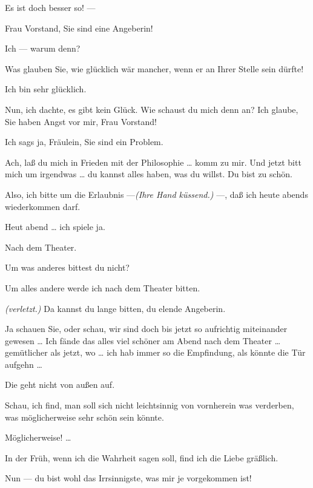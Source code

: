 \documentclass[
	final,
	a4paper,
	ngerman,
	mpinclude = true, %
	twoside = true,
	open = right,
	cleardoublepage = plain,
	DIV = 13,
	BCOR = 1cm,
	titlepage = firstiscover,
	]{scrbook}
\newcommand{\direction}[1]{\textit{(#1)}}
\newcommand{\thecharacter}[1]{\textup{\textsc{#1}}\xspace}
\newcommand{\theschauspielerin}{\thecharacter{Daniela}}
\newcommand{\theentrepeneurin}{\thecharacter{Katerina Albrecht}}
\newcommand{\character}[1]{\item[#1:]}
\newcommand{\schauspielerin}{\character{\theschauspielerin}}
\newcommand{\entrepeneurin}{\character{\theentrepeneurin}}
\begin{document}
\begin{play}
	\entrepeneurin
	Es ist doch besser so! ---

	\schauspielerin
	Frau Vorstand, Sie sind eine Angeberin!

	\entrepeneurin
	Ich --- warum denn?

	\schauspielerin
	Was glauben Sie, wie glücklich wär mancher, wenn er an Ihrer Stelle sein dürfte!

	\entrepeneurin
	Ich bin sehr glücklich.

	\schauspielerin
	Nun, ich dachte, es gibt kein Glück. Wie schaust du mich denn an? Ich glaube, Sie haben Angst vor mir, Frau Vorstand!

	\entrepeneurin
	Ich sags ja, Fräulein, Sie sind ein Problem.

	\schauspielerin
	Ach, laß du mich in Frieden mit der Philosophie \ldots{} komm zu mir. Und jetzt bitt mich um irgendwas \ldots{} du kannst alles haben, was du willst. Du bist zu schön.

	\entrepeneurin
	Also, ich bitte um die Erlaubnis ---\direction{Ihre Hand küssend.} ---, daß ich heute abends wiederkommen darf.

	\schauspielerin
	Heut abend \ldots{} ich spiele ja.

	\entrepeneurin
	Nach dem Theater.

	\schauspielerin
	Um was anderes bittest du nicht?

	\entrepeneurin
	Um alles andere werde ich nach dem Theater bitten.

	\schauspielerin
	\direction{verletzt.} Da kannst du lange bitten, du elende Angeberin.

	\entrepeneurin
	Ja schauen Sie, oder schau, wir sind doch bis jetzt so aufrichtig miteinander gewesen \ldots{} Ich fände das alles viel schöner am Abend nach dem Theater \ldots{} gemütlicher als jetzt, wo \ldots{} ich hab immer so die Empfindung, als könnte die Tür aufgehn \ldots{}

	\schauspielerin
	Die geht nicht von außen auf.

	\entrepeneurin
	Schau, ich find, man soll sich nicht leichtsinnig von vornherein was verderben, was möglicherweise sehr schön sein könnte.

	\schauspielerin
	Möglicherweise! \ldots{}

	\entrepeneurin
	In der Früh, wenn ich die Wahrheit sagen soll, find ich die Liebe gräßlich.

	\schauspielerin
	Nun --- du bist wohl das Irrsinnigste, was mir je vorgekommen ist!


\end{play}
\end{document}
